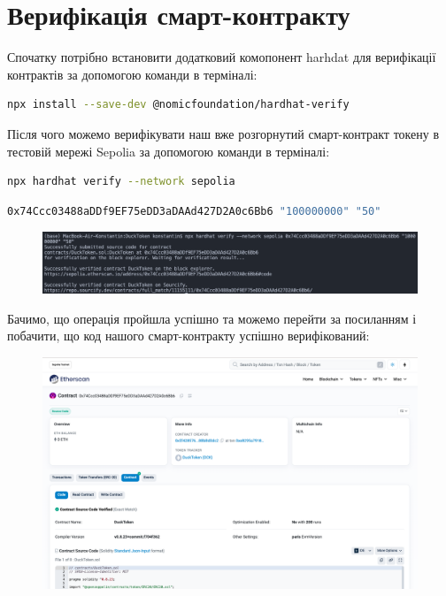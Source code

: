 \section {Верифікація смарт-контракту}

Спочатку потрібно встановити додатковий комопонент harhdat для верифікації контрактів за допомогою команди в терміналі:
\begin{lstlisting}[language=bash, basicstyle=\ttfamily]
npx install --save-dev @nomicfoundation/hardhat-verify
\end{lstlisting} 

Після чого можемо верифікувати наш вже розгорнутий смарт-контракт токену в тестовій мережі Sepolia за допомогою команди в терміналі:

\begin{lstlisting}[language=bash, basicstyle=\ttfamily]
npx hardhat verify --network sepolia
\end{lstlisting}
\begin{lstlisting}[language=bash, basicstyle=\ttfamily]
0x74Ccc03488aDDf9EF75eDD3aDAAd427D2A0c6Bb6 "100000000" "50"
\end{lstlisting}

    \begin{figure}[ht]
        \centering
        \includegraphics[scale=0.4]{IMAGES/hardhat-verify.png}
        \label{fig_vsc}
    \end{figure}

Бачимо, що операція пройшла успішно та можемо перейти за посиланням і побачити, що код нашого смарт-контракту успішно верифікований:

    \begin{figure}[ht!]
        \centering
        \includegraphics[scale=0.345]{IMAGES/etherscan-verify-code.png}
        \label{fig_vsc}
    \end{figure}


